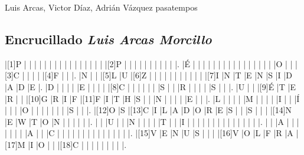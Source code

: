 \Titular*%
{Pasatempos}%
{Luis Arcas, Victor Díaz, Adrián Vázquez}%
{pasatempos}%
{}%

\begin{refsection}
\vspace*{-6mm}
\section*{\textcolor{Resalte}{Encrucillado } {\normalfont \itshape Luis Arcas Morcillo}}%

\begin{Puzzle}{27}{16}
|[1]P  |{}    |{}    |{}    |{}    |{}    |{}    |{}    |{}    |{}    |{}    |{}    |{}    |{}    |{}    |{}    |{}    |[2]P  |{}    |{}    |{}    |{}    |{}    |{}    |{}    |{}    |{}   |{} |.
|É     |{}    |{}    |{}    |{}    |{}    |{}    |{}    |{}    |{}    |{}    |{}    |{}    |{}    |{}    |{}    |{}    |O     |{}    |{}    |[3]C  |{}    |{}    |{}    |{}    |[4]F  |{}   |{} |.
|N     |{}    |{}    |[5]L  |U     |[6]Z  |{}    |{}    |{}    |{}    |{}    |{}    |{}    |{}    |{}    |{}    |{}    |[7]I  |N     |T     |E     |N     |S     |I     |D     |A     |D    |E  |.
|D     |{}    |{}    |{}    |{}    |E     |{}    |{}    |{}    |{}    |[8]C  |{}    |{}    |{}    |{}    |{}    |{}    |S     |{}    |{}    |R     |{}    |{}    |{}    |{}    |S     |{}   |{} |.
|U     |{}    |{}    |[9]É  |T     |E     |R     |{}    |{}    |[10]G |R     |I     |F     |[11]F |I     |T     |H     |S     |{}    |{}    |N     |{}    |{}    |{}    |{}    |E     |{}   |{} |.
|L     |{}    |{}    |{}    |{}    |M     |{}    |{}    |{}    |{}    |I     |{}    |{}    |Í     |{}    |{}    |{}    |O     |{}    |{}    |{}    |{}    |{}    |{}    |{}    |S     |{}   |{} |.
|[12]O |S     |[13]C |I     |L     |A     |D     |O     |R     |E     |S     |{}    |{}    |S     |{}    |{}    |{}    |[14]N |E     |W     |T     |O     |N     |{}    |{}    |{}    |{}   |{} |.
|{}    |{}    |U     |{}    |{}    |N     |{}    |{}    |{}    |{}    |T     |{}    |{}    |I     |{}    |{}    |{}    |{}    |{}    |{}    |{}    |{}    |{}    |{}    |{}    |{}    |{}   |{} |.
|{}    |{}    |A     |{}    |{}    |{}    |{}    |{}    |{}    |{}    |A     |{}    |{}    |C     |{}    |{}    |{}    |{}    |{}    |{}    |{}    |{}    |{}    |{}    |{}    |{}    |{}   |{} |.
|[15]V |E     |N     |U     |S     |{}    |{}    |{}    |[16]V |O     |L     |F     |R     |A     |[17]M |I     |O     |{}    |{}    |[18]C |{}    |{}    |{}    |{}    |{}    |{}    |{}   |{} |.

\end{Puzzle}
\end{refsection}
